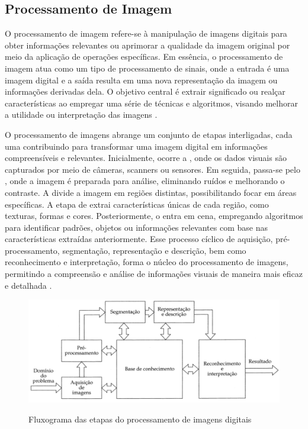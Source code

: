 \subsection[Processamento de Imagem]{Processamento de Imagem}

O processamento de imagem refere-se à manipulação de imagens digitais para obter informações relevantes ou aprimorar a qualidade da imagem original por meio da aplicação de operações específicas. Em essência, o processamento de imagem atua como um tipo de processamento de sinais, onde a entrada é uma imagem digital e a saída resulta em uma nova representação da imagem ou informações derivadas dela. O objetivo central é extrair significado ou realçar características ao empregar uma série de técnicas e algoritmos, visando melhorar a utilidade ou interpretação das imagens \cite{imagemIBM}.

O processamento de imagens abrange um conjunto de etapas interligadas, cada uma contribuindo para transformar uma imagem digital em informações compreensíveis e relevantes. Inicialmente, ocorre a , onde os dados visuais são capturados por meio de câmeras, scanners ou sensores. Em seguida, passa-se pelo , onde a imagem é preparada para análise, eliminando ruídos e melhorando o contraste. A  divide a imagem em regiões distintas, possibilitando focar em áreas específicas. A etapa de  extrai características únicas de cada região, como texturas, formas e cores. Posteriormente, o  entra em cena, empregando algoritmos para identificar padrões, objetos ou informações relevantes com base nas características extraídas anteriormente. Esse processo cíclico de aquisição, pré-processamento, segmentação, representação e descrição, bem como reconhecimento e interpretação, forma o núcleo do processamento de imagens, permitindo a compreensão e análise de informações visuais de maneira mais eficaz e detalhada \cite{imagemMonocromatica}.


\begin{figure}[H]
	\centering
    \caption{Fluxograma das etapas do processamento de imagens digitais}
	\includegraphics[scale=0.4]{figuras/processamento_imagem/ProcessamentoImagem.png}
	\label{fig:Fluxograma das etapas do processamento de imagens digitais}
\end{figure}




